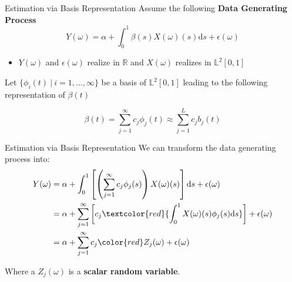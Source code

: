 \documentclass{beamer}
\begin{document}
	\begin{frame}{Estimation via Basis Representation}
		Assume the following \textbf{Data Generating Process}
		$$Y(\omega) = \alpha + \int_{0}^{1} \beta(s) X(\omega)(s) \mathrm{d}s + \epsilon(\omega)$$
		\vspace{-0.6cm}
		\begin{itemize}
			\item $Y(\omega)$ and $\epsilon(\omega)$ realize in $\mathbb{R}$ and $X(\omega)$ realizes in $\mathbb{L}^2[0,1]$
		\end{itemize}
		\vspace{0.3cm}
					
		Let $\{\phi_i(t) \: \vert \: i = 1, \dots, \infty\}$ be a basis of $\mathbb{L}^2[0,1]$ leading to the following representation of $\beta(t)$
		
		$$\beta(t) = \sum_{j = 1}^{\infty} c_j \phi_j(t) \approx \sum_{j = 1}^{L} c_j b_j(t)$$

	\end{frame}

	\begin{frame}{Estimation via Basis Representation}
		We can transform the data generating process into:
		\begin{equation}\notag
			\begin{split}
				Y(\omega) & = \alpha + \int_{0}^{1}\left[\left(\sum_{j = 1}^{\infty} c_j  \phi_j(s)\right) X(\omega)(s) \right]\mathrm{d}s + \epsilon(\omega) \\
						  & = \alpha + \sum_{j = 1}^{\infty} \left[c_j \textcolor{red}{\int_{0}^{1} X(\omega)(s) \phi_j(s)\mathrm{d}s}\right] + \epsilon(\omega)	 \\
						  & = \alpha + \sum_{j = 1}^{\infty} c_j {\color{red}Z_j(\omega)} + \epsilon(\omega)  
			\end{split}
		\end{equation}
	
		Where a $Z_j(\omega)$ is a \textbf{scalar random variable}.
	\end{frame}
\end{document}
